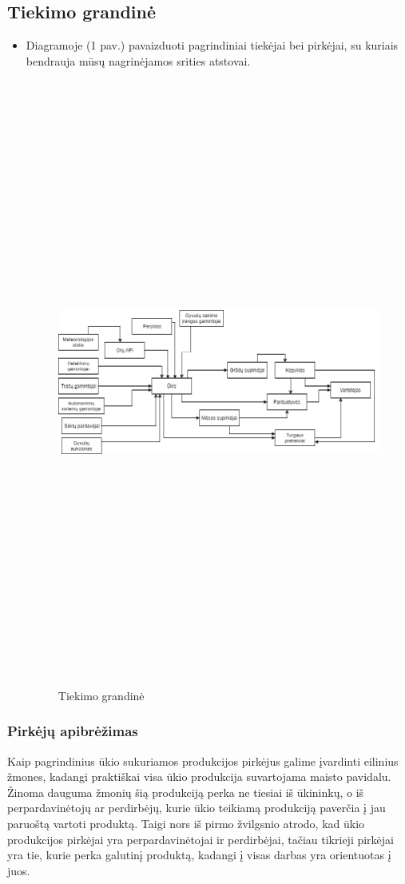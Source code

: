 \documentclass[oneside]{VUMIFPSkursinis}
\begin{document}
	\subsection{Tiekimo grandinė}
	\begin{itemize}
\item Diagramoje (1 pav.) pavaizduoti pagrindiniai tiekėjai bei pirkėjai, su kuriais bendrauja mūsų nagrinėjamos srities atstovai.
		\begin{figure}[H]
		\centering	
	\includegraphics[width=18cm,height=20cm,keepaspectratio]{supplyChain.png}
	\caption{Tiekimo grandinė}
	\label{fig:supplyChain}
\end{figure}
\end{itemize}
\subsubsection{Pirkėjų apibrėžimas}
Kaip pagrindinius ūkio sukuriamos produkcijos pirkėjus galime įvardinti eilinius žmones, kadangi praktiškai visa ūkio produkcija suvartojama maisto pavidalu. Žinoma dauguma žmonių šią produkciją perka ne tiesiai iš ūkininkų, o iš perpardavinėtojų ar perdirbėjų, kurie ūkio teikiamą produkciją paverčia į jau paruoštą vartoti produktą. Taigi nors iš pirmo žvilgsnio atrodo, kad ūkio produkcijos pirkėjai yra perpardavinėtojai ir perdirbėjai, tačiau tikrieji pirkėjai yra tie, kurie perka galutinį produktą, kadangi į visas darbas yra orientuotas į juos.
\end{document}

